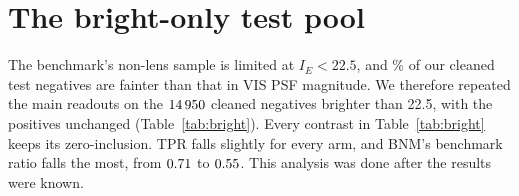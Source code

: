 \section{The bright-only test pool}
\label{app:bright}

The benchmark's non-lens sample is limited at $I_E < 22.5$, and \FracFaintTest{}\% of our
cleaned test negatives are fainter than that in VIS PSF magnitude. We therefore repeated the
main readouts on the $14\,950{}$ cleaned negatives brighter than 22.5, with the positives
unchanged (Table~\ref{tab:bright}). Every contrast in Table~\ref{tab:bright} keeps its zero-inclusion. TPR falls slightly
for every arm, and BNM's benchmark ratio falls the most, from $0.71{}$ to
$0.55{}$. This analysis was done after the results were known.


